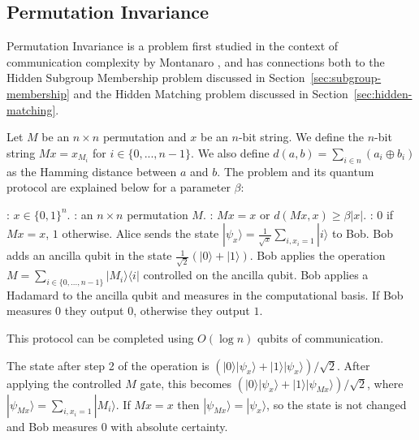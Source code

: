 \documentclass[a4paper]{article}
\begin{document}
\begin{appendices}
    \section{Permutation Invariance}
    \label{sec:perm-invariance}

        Permutation Invariance is a problem first studied in the context of communication complexity by Montanaro \cite{Montanaro:2011:NES:2230916.2230919}, and has connections both to the Hidden Subgroup Membership problem discussed in Section~\ref{sec:subgroup-membership} and the Hidden Matching problem discussed in Section~\ref{sec:hidden-matching}.

        Let $M$ be an $n \times n$ permutation and $x$ be an $n$-bit string. We define the $n$-bit string $Mx = x_{M_i}$ for $i \in \{0,...,n-1\}$. We also define $d(a, b) = \sum_{i \in n}(a_i \oplus b_i)$ as the Hamming distance between $a$ and $b$. The problem and its quantum protocol are explained below for a parameter $\beta$:

        \begin{codebox}
            \zi {}: $x \in \{0,1\}^n$.
            \zi {}: an $n\times n$ permutation $M$.
            \zi {}: $Mx = x$ or $d(Mx, x) \geq \beta|x|$.
            \zi {}: $0$ if $Mx = x$, $1$ otherwise.
            \li Alice sends the state $|\psi_x\rangle = \frac{1}{\sqrt{x}}\sum_{i, x_i=1}|i\rangle$ to Bob.
            \li Bob adds an ancilla qubit in the state $\frac{1}{\sqrt{2}}(|0\rangle + |1\rangle)$.
            \li Bob applies the operation $M = \sum_{i \in \{0,...,n-1\}}|M_i\rangle\langle i|$ controlled on the ancilla qubit.
            \li Bob applies a Hadamard to the ancilla qubit and measures in the computational basis.
            \li If Bob measures $0$ they output $0$, otherwise they output $1$.
        \end{codebox}

        This protocol can be completed using $O(\log n)$ qubits of communication.

        The state after step 2 of the operation is $(|0\rangle|\psi_x\rangle + |1\rangle|\psi_x\rangle)/\sqrt{2}$. After applying the controlled $M$ gate, this becomes $(|0\rangle|\psi_x\rangle + |1\rangle|\psi_{Mx}\rangle)/\sqrt{2}$, where $|\psi_{Mx}\rangle = \sum_{i, x_i = 1}|M_i\rangle$. If $Mx = x$ then $|\psi_{Mx}\rangle = |\psi_x\rangle$, so the state is not changed and Bob measures $0$ with absolute certainty.


\end{appendices}
\end{document}
